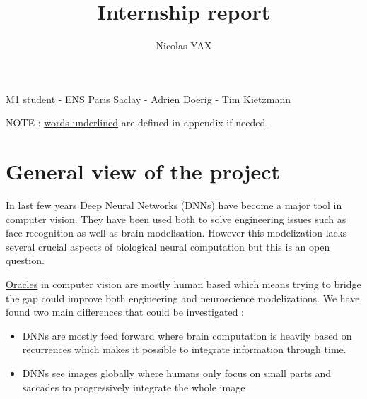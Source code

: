 \documentclass[11pt]{article}
\title{\textbf{Internship report}}
\author{Nicolas YAX}
\date{}
\begin{document}







\maketitle
M1 student - ENS Paris Saclay - Adrien Doerig - Tim Kietzmann

NOTE : \underline{words underlined} are defined in appendix if needed.
\section{General view of the project}
In last few years Deep Neural Networks (DNNs) have become a major tool in computer vision. They have been used both to solve engineering issues such as face recognition as well as brain modelisation. However this modelization lacks several crucial aspects of biological neural computation but this is an open question.

\underline{Oracles} in computer vision are mostly human based which means trying to bridge the gap could improve both engineering and neuroscience modelizations. We have found two main differences that could be investigated :
\begin{itemize}
\item DNNs are mostly feed forward where brain computation is heavily based on recurrences which makes it possible to integrate information through time.

\item DNNs see images globally where humans only focus on small parts and saccades to progressively integrate the whole image
\end{itemize}
\end{document}
